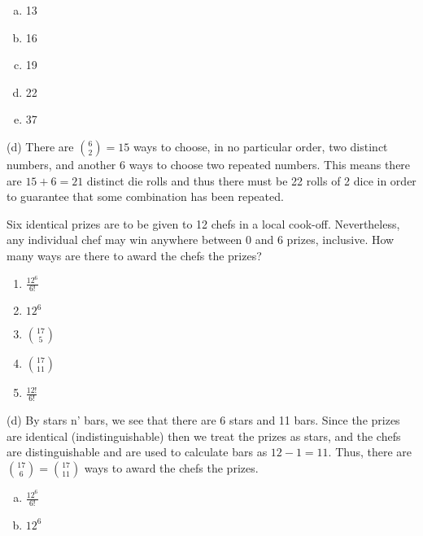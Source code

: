 \begin{solution}
\newpage
\begin{enumerate}[(a)]
	\item  13
    
	\item  16
    
	\item  19
    
	\item  22
    
	\item  37

\end{enumerate}
\begin{solution}

(d) There are $\binom{6}{2} = 15$ ways to choose, in no particular order, two distinct numbers, and another 6 ways to choose two repeated numbers. This means there are $15 + 6 = 21$ distinct die rolls and thus there must be 22 rolls of 2 dice in order to guarantee that some combination has been repeated.

\end{solution}


Six identical prizes are to be given to 12 chefs in a local cook-off. Nevertheless, any individual chef may win anywhere between 0 and 6 prizes, inclusive. How many ways are there to award the chefs the prizes?
\begin{enumerate}[{(a)}]
    \item $\frac{12^6}{6!}$
    \item $12^6$
    \item $\binom{17}{5}$
    \item $\binom{17}{11}$
    \item $\frac{12!}{6!}$
\end{enumerate}
\begin{solution}
(d) By stars n' bars, we see that there are 6 stars and 11 bars. Since the prizes are identical (indistinguishable) then we treat the prizes as stars, and the chefs are distinguishable and are used to calculate bars as $12 - 1 = 11$. Thus, there are $\binom{17}{6} = \binom{17}{11}$ ways to award the chefs the prizes.
\end{solution}

\vspace{2cm}
\begin{enumerate}[(a)]
	\item  $\frac{12^6}{6!}$
    
	\item  $12^6$
    

\end{enumerate}
\end{solution}
